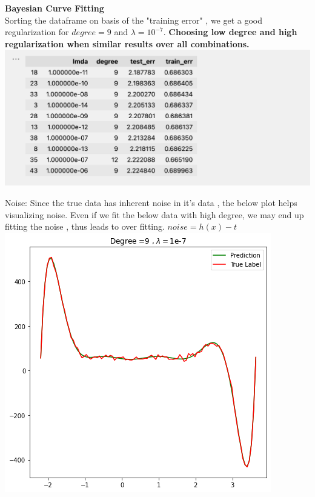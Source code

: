 \documentclass[11pt]{beamer}
\begin{document}
\begin{frame}
\textbf{Bayesian Curve Fitting}\\
Sorting the dataframe on basis of the "training error" , we get a good regularization for $degree=9$ and $\lambda=10^{-7}$. \textbf{Choosing low degree and high regularization when similar results over all combinations.}
\includegraphics[scale=0.5]{images/32.png}
\end{frame}




\begin{frame}
Noise: Since the true data has inherent noise in it's data , the below plot helps visualizing noise.
Even if we fit the below data with high degree, we may end up fitting the noise , thus leads to over fitting.
$noise = h(x) -t$
\includegraphics[scale=0.4]{images/24.png}
\end{frame}
\end{document}
